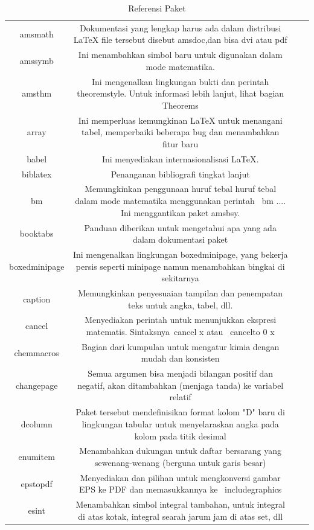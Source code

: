 \begin{table}[ht]
	\caption{Referensi Paket}
	\centering
	\begin{tabular}{cccc}
		\hline
		amsmath&Dokumentasi yang lengkap harus ada dalam distribusi LaTeX file tersebut disebut amsdoc,dan bisa dvi atau pdf&\\
		amssymb&Ini menambahkan simbol baru untuk digunakan dalam mode matematika.&\\
		amsthm&Ini mengenalkan lingkungan bukti dan perintah theoremstyle. Untuk informasi lebih lanjut, lihat bagian Theorems&\\
		array&Ini memperluas kemungkinan LaTeX untuk menangani tabel, memperbaiki beberapa bug dan menambahkan fitur baru&\\
		babel&Ini menyediakan internasionalisasi LaTeX. &\\
		biblatex&Penanganan bibliografi tingkat lanjut&\\
		bm&Memungkinkan penggunaan huruf tebal huruf tebal dalam mode matematika menggunakan perintah \ bm {...}. Ini menggantikan paket amsbsy.&\\
		booktabs&Panduan diberikan untuk mengetahui apa yang ada dalam dokumentasi paket&\\
		boxedminipage&Ini mengenalkan lingkungan boxedminipage, yang bekerja persis seperti minipage namun menambahkan bingkai di sekitarnya&\\
		caption&Memungkinkan penyesuaian tampilan dan penempatan teks untuk angka, tabel, dll.&\\
		cancel&Menyediakan perintah untuk menunjukkan ekspresi matematis. Sintaksnya\ cancel {x} atau \ cancelto {0} {x}&\\
		chemmacros&Bagian dari kumpulan untuk mengatur kimia dengan mudah dan konsisten&\\
		changepage&Semua argumen bisa menjadi bilangan positif dan negatif, akan ditambahkan (menjaga tanda) ke variabel relatif&\\
		dcolumn&Paket tersebut mendefinisikan format kolom "D" baru di lingkungan tabular untuk menyelaraskan angka pada kolom pada titik desimal&\\
		enumitem&Menambahkan dukungan untuk daftar bersarang yang sewenang-wenang (berguna untuk garis besar)&\\
		epstopdf&Menyediakan dan pilihan untuk mengkonversi gambar EPS ke PDF dan memasukkannya ke \ includegraphics {}&\\
		esint&Menambahkan simbol integral tambahan, untuk integral di atas kotak, integral searah jarum jam di atas set, dll&\\

\end{tabular}
\end{table}
